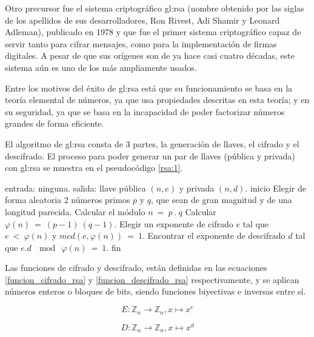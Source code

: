   Otro precursor fue el sistema criptográfico \acrshort{gl:rsa} (nombre 
  obtenido por las siglas de los apellidos de sus desarrolladores, Ron Rivest, 
  Adi Shamir y Leonard Adleman), publicado en 1978 y que fue el primer sistema 
  criptográfico capaz de servir tanto para cifrar mensajes, como para la 
  implementación de firmas digitales. A pesar de que sus orígenes son de ya 
  hace casi cuatro décadas, este sistema aún es uno de los más ampliamente 
  usados.

  Entre los motivos del éxito de \acrshort{gl:rsa} está que su funcionamiento 
  se basa en la teoría elemental de números, ya que usa propiedades descritas 
  en esta teoría; y en su seguridad, ya que se basa en la incapacidad de poder 
  factorizar números grandes de forma eficiente.

  El algoritmo de \acrshort{gl:rsa} consta de 3 partes, la generación de llaves, 
  el cifrado y el descifrado. El proceso para poder generar un par de llaves 
  (pública y privada) con \acrshort{gl:rsa} se muestra en el pseudocódigo 
  \ref{rsa:1}. 

  \begin{pseudocodigo}[caption={Proceso de generación de llaves de 
    \acrshort{gl:rsa}.}, label={rsa:1}]
    entrada: ninguna.
    salida:  llave pública $(n,e)$ y privada $(n,d)$.
    inicio
      Elegir de forma aleatoria 2 números primos $p$ y $q$, que sean de gran 
      magnitud y de una longitud parecida.
      Calcular el módulo $n\: =\: p \:. \:q$
      Calcular $\varphi(n) \:= \:(p-1) \:(q-1)$.
      Elegir un exponente de cifrado $e$ tal que $e \:< \:\varphi(n)$ y $mcd(e,\varphi(n)) \:= \:1$.
      Encontrar el exponente de descifrado $d$ tal que $e . d \:\mod \:\varphi(n) \:= \:1$.
    fin
  \end{pseudocodigo}

  Las funciones de cifrado y descifrado, están definidas en las ecuaciones 
  \ref{funcion_cifrado_rsa} y \ref{funcion_descifrado_rsa} respectivamente, 
  y se aplican números enteros o bloques de bits, siendo funciones biyectivas 
  e inversas entre sí.

  \begin{equation}
    \label{funcion_cifrado_rsa}
    E: \mathbb{Z}_n \longrightarrow \mathbb{Z}_n, x \longmapsto x^e 
  \end{equation}

  \begin{equation}
    \label{funcion_descifrado_rsa}
    D: \mathbb{Z}_n \longrightarrow \mathbb{Z}_n, x \longmapsto x^d 
  \end{equation}

